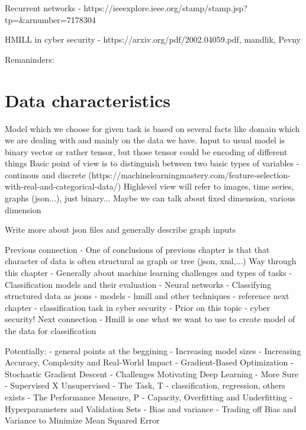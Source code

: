 Recurrent networks - https://ieeexplore.ieee.org/stamp/stamp.jsp?tp=&arnumber=7178304

HMILL in cyber security - https://arxiv.org/pdf/2002.04059.pdf, mandlik, Pevny




Remaninders:

\section{Data characteristics}
Model which we choose for given task is based on several facts like domain which we are dealing with and mainly on the data we have.
Input to usual model is binary vector or rather tensor, but those tensor could be encoding of different things
Basic point of view is to distinguish between two basic types of variables - continous and discrete (https://machinelearningmastery.com/feature-selection-with-real-and-categorical-data/)
Highlevel view will refer to images, time series, graphs (json...), just binary...
Maybe we can talk about fixed dimension, various dimension

Write more about json files and generally describe graph inputs

Previous connection
- One of conclusions of previous chapter is that that character of data is often structural as graph or tree (json, xml,...)
Way through this chapter
- Generally about machine learning challenges and types of tasks
- Classification models and their evaluation
- Neural networks
- Classifying structured data as jsons - models
    - hmill and other techniques - reference next chapter
- classification task in cyber security
- Prior on this topic - cyber security!
Next connection
- Hmill is one what we want to use to create model of the data for classification


\cite{GoodBengCour16}
Potentially:
- general points at the beggining
    - Increasing model sizes
    - Increasing Accuracy, Complexity and Real-World Impact
    - Gradient-Based Optimization
    - Stochastic Gradient Descent
    - Challenges Motivating Deep Learning
- More Sure
    - Supervised X Unsupervised
    - The Task, T - classification, regression, others exists
    - The Performance Measure, P
    - Capacity, Overfitting and Underfitting
    - Hyperparameters and Validation Sets
    - Bias and variance - Trading off Bias and Variance to Minimize Mean Squared
    Error

